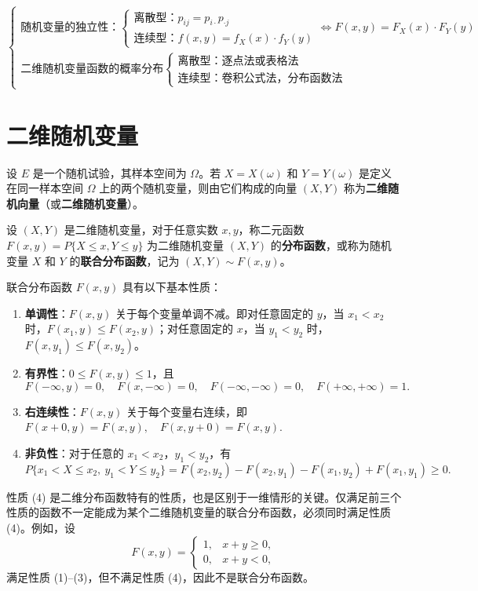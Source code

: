 \documentclass[lang=cn,11pt]{elegantbook}
\begin{document}
\[\begin{cases}
\text{随机变量的独立性：}
\begin{cases}
\text{离散型：} p_{ij}=p_{i\cdot}p_{\cdot j} \\
\text{连续型：} f(x,y)=f_X(x)\cdot f_Y(y)
\end{cases}
\iff F(x,y)=F_X(x)\cdot F_Y(y) \\[12pt]

\text{二维随机变量函数的概率分布}
\begin{cases}
\text{离散型：逐点法或表格法} \\
\text{连续型：卷积公式法，分布函数法}
\end{cases}
\end{cases}
\]

\section{二维随机变量}

\begin{definition}[二维随机变量] \label{def:2d-random-variable}
设 \(E\) 是一个随机试验，其样本空间为 \(\Omega\)。若 \(X=X(\omega)\) 和 \(Y=Y(\omega)\) 是定义在同一样本空间 \(\Omega\) 上的两个随机变量，则由它们构成的向量 \((X,Y)\) 称为\textbf{二维随机向量}（或\textbf{二维随机变量}）。
\end{definition}

\begin{definition}[联合分布函数] \label{def:joint-df}
设 $(X,Y)$ 是二维随机变量，对于任意实数 $x,y$，称二元函数
\(
F(x,y) = P\{X \leqslant x, Y \leqslant y\}
\)
为二维随机变量 $(X,Y)$ 的\textbf{分布函数}，或称为随机变量 $X$ 和 $Y$ 的\textbf{联合分布函数}，记为 $(X,Y) \sim F(x,y)$。
\end{definition}
\begin{property}\label{prop:joint-df}
联合分布函数 $F(x,y)$ 具有以下基本性质：
\begin{enumerate}
    \item \textbf{单调性}：$F(x,y)$ 关于每个变量单调不减。即对任意固定的 $y$，当 $x_1 < x_2$ 时，$F(x_1,y) \leqslant F(x_2,y)$；对任意固定的 $x$，当 $y_1 < y_2$ 时，$F(x,y_1) \leqslant F(x,y_2)$。
    \item \textbf{有界性}：$0 \leqslant F(x,y) \leqslant 1$，且
    \[
    F(-\infty, y) = 0, \quad F(x, -\infty) = 0, \quad F(-\infty, -\infty) = 0, \quad F(+\infty, +\infty) = 1.
    \]
    \item \textbf{右连续性}：$F(x,y)$ 关于每个变量右连续，即
    \(
    F(x+0, y) = F(x,y), \quad F(x, y+0) = F(x,y).
    \)
    \item \textbf{非负性}：对于任意的 $x_1 < x_2$，$y_1 < y_2$，有
    \[
    P\{x_1 < X \leqslant x_2,\ y_1 < Y \leqslant y_2\} = F(x_2,y_2) - F(x_2,y_1) - F(x_1,y_2) + F(x_1,y_1) \geqslant 0.
    \]
\end{enumerate}
性质 (4) 是二维分布函数特有的性质，也是区别于一维情形的关键。仅满足前三个性质的函数不一定能成为某个二维随机变量的联合分布函数，必须同时满足性质 (4)。例如，设
\[
F(x,y) = \begin{cases} 1, & x+y \geqslant 0, \\ 0, & x+y < 0, \end{cases}
\]
满足性质 (1)--(3)，但不满足性质 (4)，因此不是联合分布函数。
\end{property}
\end{document}
